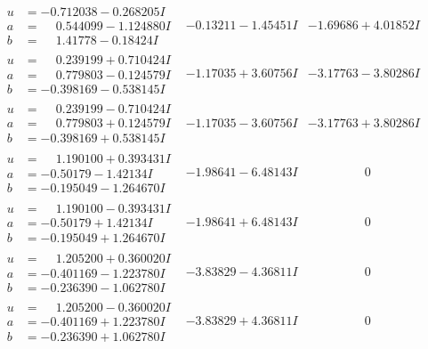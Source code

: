 \documentclass[1p]{elsarticle_modified}
\theoremstyle{definition}
\begin{document}
$$\begin{array}{c|c|c}
\begin{aligned}
u &= -0.712038 - 0.268205 I \\
a &= \phantom{-}0.544099 - 1.124880 I \\
b &= \phantom{-}1.41778 - 0.18424 I\end{aligned}
 & -0.13211 - 1.45451 I & -1.69686 + 4.01852 I \\ \hline\begin{aligned}
u &= \phantom{-}0.239199 + 0.710424 I \\
a &= \phantom{-}0.779803 - 0.124579 I \\
b &= -0.398169 - 0.538145 I\end{aligned}
 & -1.17035 + 3.60756 I & -3.17763 - 3.80286 I \\ \hline\begin{aligned}
u &= \phantom{-}0.239199 - 0.710424 I \\
a &= \phantom{-}0.779803 + 0.124579 I \\
b &= -0.398169 + 0.538145 I\end{aligned}
 & -1.17035 - 3.60756 I & -3.17763 + 3.80286 I \\ \hline\begin{aligned}
u &= \phantom{-}1.190100 + 0.393431 I \\
a &= -0.50179 - 1.42134 I \\
b &= -0.195049 - 1.264670 I\end{aligned}
 & -1.98641 - 6.48143 I & \phantom{-0.000000 } 0 \\ \hline\begin{aligned}
u &= \phantom{-}1.190100 - 0.393431 I \\
a &= -0.50179 + 1.42134 I \\
b &= -0.195049 + 1.264670 I\end{aligned}
 & -1.98641 + 6.48143 I & \phantom{-0.000000 } 0 \\ \hline\begin{aligned}
u &= \phantom{-}1.205200 + 0.360020 I \\
a &= -0.401169 - 1.223780 I \\
b &= -0.236390 - 1.062780 I\end{aligned}
 & -3.83829 - 4.36811 I & \phantom{-0.000000 } 0 \\ \hline\begin{aligned}
u &= \phantom{-}1.205200 - 0.360020 I \\
a &= -0.401169 + 1.223780 I \\
b &= -0.236390 + 1.062780 I\end{aligned}
 & -3.83829 + 4.36811 I & \phantom{-0.000000 } 0\\

\end{array}$$
\end{document}
